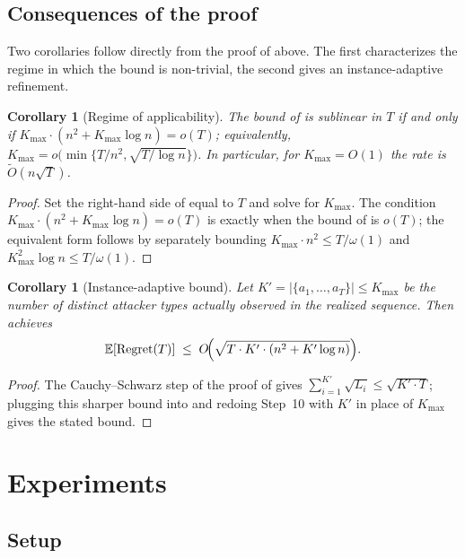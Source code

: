 \documentclass[letterpaper,9pt,twocolumn]{extarticle}
\newcommand{\EE}{\mathbb{E}}
\newcommand{\Kmax}{K_{\max}}
\newcommand{\Regret}{\mathrm{Regret}}
\theoremstyle{plain}
\newtheorem{corollary}[theorem]{Corollary}
\theoremstyle{definition}
\theoremstyle{remark}
\begin{document}
\subsection{Consequences of the proof}
\label{sec:consequences}

Two corollaries follow directly from the proof of  above.
The first characterizes the regime in which the bound is non-trivial,
the second gives an instance-adaptive refinement.

\begin{corollary}[Regime of applicability]
\label{cor:regime}
The bound of  is sublinear in $T$ if and only if
$\Kmax\cdot(n^2+\Kmax\log n)=o(T)$; equivalently,
$\Kmax=o\!\bigl(\min\{T/n^2,\sqrt{T/\log n}\}\bigr)$.
In particular, for $\Kmax=O(1)$ the rate is $\tilde O(n\sqrt T)$.
\end{corollary}

\begin{proof}
Set the right-hand side of  equal to $T$ and solve for
$\Kmax$. The condition $\Kmax\cdot(n^2+\Kmax\log n)=o(T)$ is exactly
when the bound of  is $o(T)$; the equivalent form follows
by separately bounding $\Kmax\cdot n^2\le T/\omega(1)$ and
$\Kmax^2\log n\le T/\omega(1)$.
\end{proof}

\begin{corollary}[Instance-adaptive bound]
\label{cor:adaptive}
Let $K'=|\{a_1,\dots,a_T\}|\le\Kmax$ be the number of \emph{distinct}
attacker types actually observed in the realized sequence. Then
 achieves
\[
\EE[\Regret(T)]\;\le\;O\!\Bigl(\sqrt{T\cdot K'\cdot(n^2+K'\log n)}\Bigr).
\]
\end{corollary}

\begin{proof}
The Cauchy--Schwarz step  of the proof of 
gives $\sum_{i=1}^{K'}\sqrt{L_i}\le\sqrt{K'\cdot T}$; plugging this
sharper bound into  and redoing Step~10 with $K'$ in
place of $\Kmax$ gives the stated bound.\end{proof}


\section{Experiments}
\label{sec:exp}

\subsection{Setup}
\end{document}
